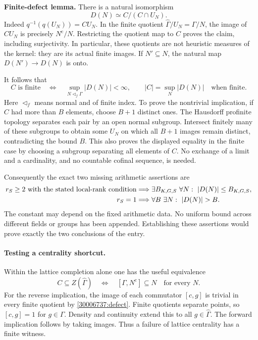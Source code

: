 \documentclass[11pt,a4paper]{article}
\numberwithin{equation}{section}
\begin{document}
\textbf{Finite-defect lemma.} There is a natural isomorphism
\begin{equation}\label{30006737:defect}
 D(N)\simeq C/(C\cap U_N).
\end{equation}
Indeed $q^{-1}(q(U_N))=CU_N$.  In the finite quotient
$\widehat\Gamma/U_N=\Gamma/N$, the image of $CU_N$ is precisely
$N^{\mathrm c}/N$.  Restricting the quotient map to $C$ proves the
claim, including surjectivity.  In particular, these quotients are not
heuristic measures of the kernel: they are its actual finite images.
If $N'\subseteq N$, the natural map $D(N')\to D(N)$ is onto.

It follows that
\begin{equation}\label{30006737:equivalence}
 C\text{ is finite}\quad\Longleftrightarrow\quad
 \sup_{N\triangleleft_f\Gamma}|D(N)|<\infty,
 \qquad
 |C|=\sup_N|D(N)|\quad\text{when finite}.
\end{equation}
Here $\triangleleft_f$ means normal and of finite index.  To prove the
nontrivial implication, if $C$ had more than $B$ elements, choose $B+1$
distinct ones.  The Hausdorff profinite topology separates each pair by
an open normal subgroup.  Intersect finitely many of these subgroups to
obtain some $U_N$ on which all $B+1$ images remain distinct, contradicting
the bound $B$.  This also proves the displayed equality in the finite
case by choosing a subgroup separating all elements of $C$.
No exchange of a limit and a cardinality, and no countable cofinal
sequence, is needed.

Consequently the exact two missing arithmetic assertions are
\begin{align}\label{30006737:targets}
 r_S\geq2\text{ with the stated local-rank condition}
 &\Longrightarrow \exists B_{K,G,S}\ \forall N:\ |D(N)|\leq B_{K,G,S},\\
 r_S=1&\Longrightarrow \forall B\ \exists N:\ |D(N)|>B.\notag
\end{align}
The constant may depend on the fixed arithmetic data.  No uniform bound
across different fields or groups has been appended.  Establishing these
assertions would prove exactly the two conclusions of the entry.

\paragraph{Testing a centrality shortcut.}
Within the lattice completion alone one has the useful equivalence
\begin{equation}\label{30006737:center}
 C\subseteq Z(\widehat\Gamma)
 \quad\Longleftrightarrow\quad
 [\Gamma,N^{\mathrm c}]\subseteq N\quad\text{for every }N.
\end{equation}
For the reverse implication, the image of each commutator $[c,g]$ is
trivial in every finite quotient by \eqref{30006737:defect}.  Finite quotients
separate points, so $[c,g]=1$ for $g\in\Gamma$.  Density and continuity
extend this to all $g\in\widehat\Gamma$.  The forward implication follows
by taking images.  Thus a failure of lattice centrality has a finite
witness.
\end{document}
